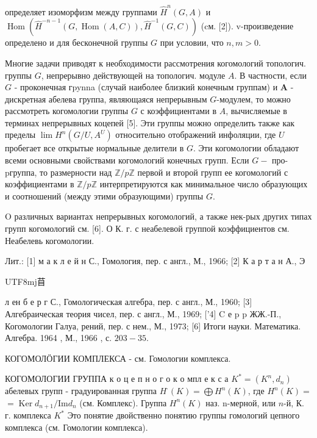 \documentclass[10pt]{article}
\begin{document}
определяет изоморфизм между группами $\hat{H}^{n}(G, A)$ и $\operatorname{Hom}\left(\hat{H}^{-n-1}(G, \operatorname{Hom}(A, C)), \hat{H}^{-1}(G, C)\right)$ (cм. [2]). v-произведение определено и для бесконечной группы $G$ при условии, что $n, m>0$.



Многие задачи приводят к необходимости рассмотрения когомологий топологич. группы $G$, непрерывно действующей на топологич. модуле $A$. В частности, если $G$ - проконечная гpynna (случай наиболее близкий конечным группам) и $\boldsymbol{A}$ - дискретная абелева группа, являющаяся непрерывным $G$-модулем, то можно рассмотреть когомологии группы $G$ с коэффициентами в $A$, вычисляемые в терминах непрерывных коцепей [5]. Эти группы можно определить также как пределы $\lim H^{n}\left(G / U, A^{U}\right)$ относительно отображений инфоляции, где $U$ пробегает все открытые нормальные делители в $G$. Эти когомологии обладают всеми основными свойствами когомологий конечных групп. Если $G-$ про-pгруппа, то размерности над $\mathbb{Z} / p \mathbb{Z}$ первой и второй групп ее когомологий с коэффициентами в $\mathbb{Z} / p \mathbb{Z}$ интерпретируются как минимальное число образующих и соотношений (между этими образующими) группы $G$.



$\mathrm{O}$ различных вариантах непрерывных когомологий, а также нек-рых других типах групп когомологий см. [6]. О К. г. с неабелевой группой коэффициентов см. Неабелевь когомологии.



Лит.: [1] м а к л е й н С., Гомология, пер. с англ., М., 1966; [2] К а р т а н А., Э \begin{CJK}{UTF8}{mj}苜\end{CJK} л ен б е р г С., Гомологическая алгебра, пер. с англ., М., 1960; [3] Алгебраическая теория чисел, пер. с англ., М., 1969; ['4] C е p p ЖЖ.-П., Когомологии Галуа, рений, пер. с нем., М., 1973; [6] Итоги науки. Математика. Алгебра. 1964 , М., 1966 , с. $203-35$.



КОГОМОЛӦГИИ КОМПЛЕКСА - см. Гомологии комплекса.



КОГОМОЛОГИИ ГРУППА к о ц е п н о г о к о мпл е к с а $K^{*}=\left(K^{n}, d_{n}\right)$ абелевых групп - градуированная группа $H^{\cdot}(K)=\bigoplus H^{n}(K)$, где $H^{n}(K)=$ $=\operatorname{Ker} d_{n+1} / \mathrm{Im} d_{n}$ (см. Комплекс). Группа $H^{n}(K)$ наз. n-мерной, или $n$-й, К. г. комплекса $K^{*}$ Это понятие двойственно понятию группы гомологий цепного комплекса (см. Гомологии комплекса).
\end{document}
